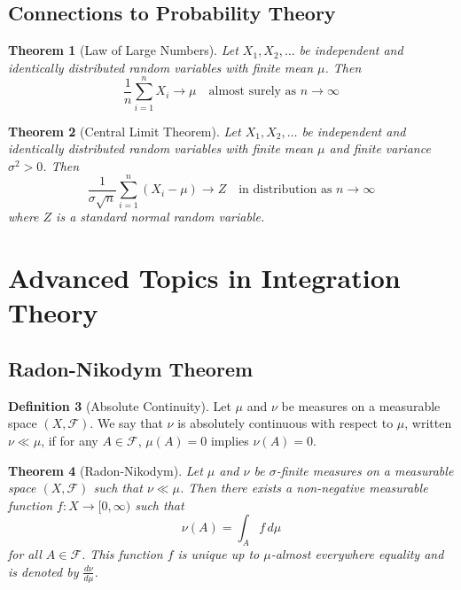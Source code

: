 \documentclass[12pt,a4paper]{article}
\theoremstyle{plain}
\newtheorem{theorem}{Theorem}[section]
\theoremstyle{definition}
\newtheorem{definition}[theorem]{Definition}
\begin{document}
\subsection{Connections to Probability Theory}

\begin{theorem}[Law of Large Numbers]
Let $X_1, X_2, \ldots$ be independent and identically distributed random variables with finite mean $\mu$. Then
\begin{equation}
\frac{1}{n} \sum_{i=1}^{n} X_i \to \mu \quad \text{almost surely as } n \to \infty
\end{equation}
\end{theorem}

\begin{theorem}[Central Limit Theorem]
Let $X_1, X_2, \ldots$ be independent and identically distributed random variables with finite mean $\mu$ and finite variance $\sigma^2 > 0$. Then
\begin{equation}
\frac{1}{\sigma\sqrt{n}} \sum_{i=1}^{n} (X_i - \mu) \to Z \quad \text{in distribution as } n \to \infty
\end{equation}
where $Z$ is a standard normal random variable.
\end{theorem}

\section{Advanced Topics in Integration Theory}

\subsection{Radon-Nikodym Theorem}

\begin{definition}[Absolute Continuity]
Let $\mu$ and $\nu$ be measures on a measurable space $(X, \mathcal{F})$. We say that $\nu$ is absolutely continuous with respect to $\mu$, written $\nu \ll \mu$, if for any $A \in \mathcal{F}$, $\mu(A) = 0$ implies $\nu(A) = 0$.
\end{definition}

\begin{theorem}[Radon-Nikodym]
Let $\mu$ and $\nu$ be $\sigma$-finite measures on a measurable space $(X, \mathcal{F})$ such that $\nu \ll \mu$. Then there exists a non-negative measurable function $f: X \to [0, \infty)$ such that
\begin{equation}
\nu(A) = \int_A f \, d\mu
\end{equation}
for all $A \in \mathcal{F}$. This function $f$ is unique up to $\mu$-almost everywhere equality and is denoted by $\frac{d\nu}{d\mu}$.
\end{theorem}
\end{document}
